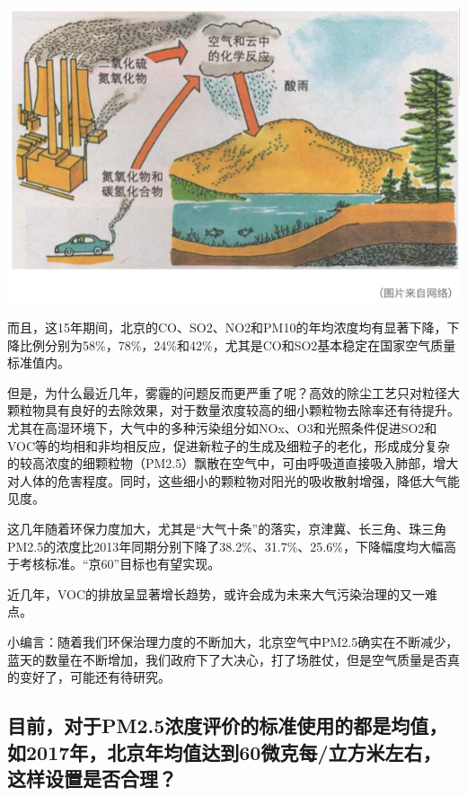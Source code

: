 \documentclass[
]{book}
\begin{document}
\includegraphics[width=8.33in]{images/air2}

而且，这15年期间，北京的CO、SO2、NO2和PM10的年均浓度均有显著下降，下降比例分别为58\%，78\%，24\%和42\%，尤其是CO和SO2基本稳定在国家空气质量标准值内。

但是，为什么最近几年，雾霾的问题反而更严重了呢？高效的除尘工艺只对粒径大颗粒物具有良好的去除效果，对于数量浓度较高的细小颗粒物去除率还有待提升。尤其在高湿环境下，大气中的多种污染组分如NOx、O3和光照条件促进SO2和VOC等的均相和非均相反应，促进新粒子的生成及细粒子的老化，形成成分复杂的较高浓度的细颗粒物（PM2.5）飘散在空气中，可由呼吸道直接吸入肺部，增大对人体的危害程度。同时，这些细小的颗粒物对阳光的吸收散射增强，降低大气能见度。

这几年随着环保力度加大，尤其是``大气十条''的落实，京津冀、长三角、珠三角PM2.5的浓度比2013年同期分别下降了38.2\%、31.7\%、25.6\%，下降幅度均大幅高于考核标准。``京60''目标也有望实现。

近几年，VOC的排放呈显著增长趋势，或许会成为未来大气污染治理的又一难点。

小编言：随着我们环保治理力度的不断加大，北京空气中PM2.5确实在不断减少，蓝天的数量在不断增加，我们政府下了大决心，打了场胜仗，但是空气质量是否真的变好了，可能还有待研究。

\hypertarget{ux76eeux524dux5bf9ux4e8epm2.5ux6d53ux5ea6ux8bc4ux4ef7ux7684ux6807ux51c6ux4f7fux7528ux7684ux90fdux662fux5747ux503cux59822017ux5e74ux5317ux4eacux5e74ux5747ux503cux8fbeux523060ux5faeux514bux6bcfux7acbux65b9ux7c73ux5de6ux53f3ux8fd9ux6837ux8bbeux7f6eux662fux5426ux5408ux7406}{%
\subsection{目前，对于PM2.5浓度评价的标准使用的都是均值，如2017年，北京年均值达到60微克每/立方米左右，这样设置是否合理？}\label{ux76eeux524dux5bf9ux4e8epm2.5ux6d53ux5ea6ux8bc4ux4ef7ux7684ux6807ux51c6ux4f7fux7528ux7684ux90fdux662fux5747ux503cux59822017ux5e74ux5317ux4eacux5e74ux5747ux503cux8fbeux523060ux5faeux514bux6bcfux7acbux65b9ux7c73ux5de6ux53f3ux8fd9ux6837ux8bbeux7f6eux662fux5426ux5408ux7406}}
\end{document}
